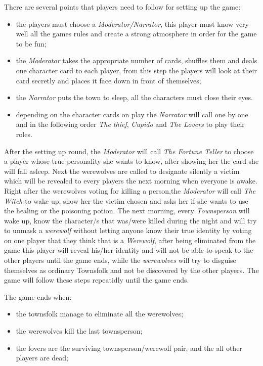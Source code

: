 \documentclass{article}
\begin{document}
There are several points that players need to follow for setting up the game:
\begin{itemize}
	\item the players must choose a \textit{Moderator/Narrator}, this player must know very well all the games rules and create a strong atmosphere in order for the game to be fun;
	\item the \textit{Moderator} takes the appropriate number of cards, shuffles them and deals one character card to each player, from this step the players will look at their card secretly and places it face down in front of themselves;
	\item the \textit{Narrator} puts the town to sleep, all the characters must close their eyes.
	\item depending on the character cards on play the \textit{Narrator} will call one by one and in the following order \textit{The thief}, \textit{Cupido} and \textit{The Lovers} to play their roles.
\end{itemize}
After the setting up round, the \textit{Moderator} will call \textit{The Fortune Teller} to choose a player whose true personality she wants to know, after showing her the card she will fall asleep. Next the werewolves are called to designate silently a victim which will be revealed to every players the next morning when everyone is awake.
Right after the werewolves voting for killing a person,the \textit{Moderator} will call \textit{The Witch} to wake up, show her the victim chosen and asks her if she wants to use the healing or the poisoning potion. 
The next morning, every \textit{Townsperson} will wake up, know the character/s that was/were killed during the night and will try to unmask a \textit{werewolf} without letting anyone know their true identity by voting on one player that they think that is a \textit{Werewolf}, after being eliminated from the game this player will reveal his/her identity and will not be able to speak to the other players until the game ends, while the \textit{werewolves} will try to disguise themselves as ordinary Townsfolk and not be discovered by the other players.
The game will follow these steps repeatidly until the game ends.

The game ends when:
\begin{itemize}
	\item the townsfolk manage to eliminate all the werewolves;
	\item the werewolves kill the last townsperson;
	\item the lovers are the surviving townsperson/werewolf pair, and the all other players are dead; 
\end{itemize}
\end{document}
